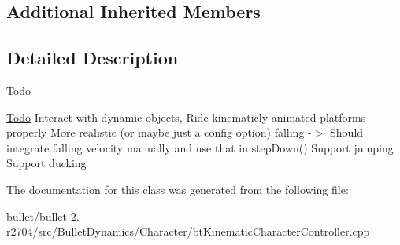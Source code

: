 \subsection*{Additional Inherited Members}


\subsection{Detailed Description}
\begin{DoxyRefDesc}{Todo}
\item[\hyperlink{todo__todo000037}{Todo}]Interact with dynamic objects, Ride kinematicly animated platforms properly More realistic (or maybe just a config option) falling -\/$>$ Should integrate falling velocity manually and use that in step\+Down() Support jumping Support ducking \end{DoxyRefDesc}


The documentation for this class was generated from the following file\+:\begin{DoxyCompactItemize}
\item 
bullet/bullet-\/2.-\/r2704/src/\+Bullet\+Dynamics/\+Character/bt\+Kinematic\+Character\+Controller.\+cpp\end{DoxyCompactItemize}
